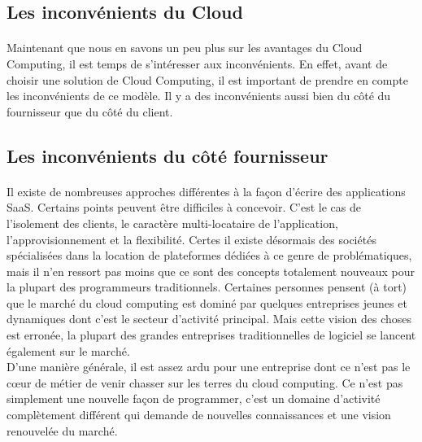 \documentclass[a4paper,12pt]{report}
\begin{document}
\begin{onehalfspace}
	\section{Les inconvénients du Cloud}
	
	\paragraph*{}
	Maintenant que nous en savons un peu plus sur les avantages du Cloud Computing, il est temps de s'intéresser aux inconvénients. En effet, avant de choisir une solution de Cloud Computing, il est important de prendre en compte les inconvénients de ce modèle. Il y a des inconvénients aussi bien du côté du fournisseur que du côté du client.
	 
	\subsection{Les inconvénients du côté fournisseur}

	\paragraph*{}
	Il existe de nombreuses approches différentes à la façon d'écrire des applications SaaS. Certains points peuvent être difficiles à concevoir. C'est le cas de l'isolement des clients, le caractère multi-locataire de l'application, l'approvisionnement et la flexibilité. Certes il existe désormais des sociétés spécialisées dans la location de plateformes dédiées à ce genre de problématiques, mais il n'en ressort pas moins que ce sont des concepts totalement nouveaux pour la plupart des programmeurs traditionnels. Certaines personnes pensent (à tort) que le marché du cloud computing est dominé par quelques entreprises jeunes et dynamiques dont c'est le secteur d'activité principal. Mais
cette vision des choses est erronée, la plupart des grandes entreprises traditionnelles de logiciel se lancent également sur le marché.\\
D'une manière générale, il est assez ardu pour une entreprise dont ce n'est pas le cœur de métier de venir chasser sur les terres du cloud computing. Ce n'est pas simplement une nouvelle façon de programmer, c'est un domaine d'activité complètement différent qui demande de nouvelles connaissances et une vision renouvelée du marché.


\end{onehalfspace}
\end{document}
